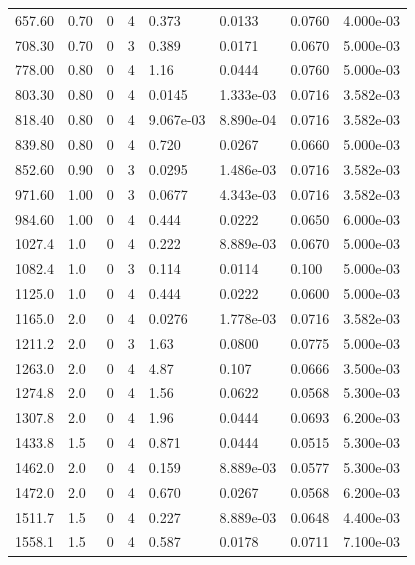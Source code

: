 \documentclass[preview]{standalone}
\begin{document}
{{\begin{tabular}{L{1.2cm}C{1.2cm} C{0.3cm}C{0.5cm} C{1.4cm}C{1.4cm} C{1.4cm}C{1.4cm}}
  657.60  &  0.70  & 0     &  4 &  0.373  & 0.0133  & 0.0760 &  4.000e-03   \\ 
  708.30  &  0.70  & 0     &  3 &  0.389  & 0.0171  & 0.0670 &  5.000e-03   \\ 
  778.00  &  0.80  & 0     &  4 &  1.16  & 0.0444  & 0.0760 &  5.000e-03   \\ 
  803.30  &  0.80  & 0     &  4 &  0.0145  & 1.333e-03  & 0.0716 &  3.582e-03   \\ 
  818.40  &  0.80  & 0     &  4 &  9.067e-03  & 8.890e-04  & 0.0716 &  3.582e-03   \\ 
  839.80  &  0.80  & 0     &  4 &  0.720  & 0.0267  & 0.0660 &  5.000e-03   \\ 
  852.60  &  0.90  & 0     &  3 &  0.0295  & 1.486e-03  & 0.0716 &  3.582e-03   \\ 
  971.60  &  1.00  & 0     &  3 &  0.0677  & 4.343e-03  & 0.0716 &  3.582e-03   \\ 
  984.60  &  1.00  & 0     &  4 &  0.444  & 0.0222  & 0.0650 &  6.000e-03   \\ 
  1027.4  &   1.0  & 0     &  4 &  0.222  & 8.889e-03  & 0.0670 &  5.000e-03   \\ 
  1082.4  &   1.0  & 0     &  3 &  0.114  & 0.0114  & 0.100 &  5.000e-03   \\ 
  1125.0  &   1.0  & 0     &  4 &  0.444  & 0.0222  & 0.0600 &  5.000e-03   \\ 
  1165.0  &   2.0  & 0     &  4 &  0.0276  & 1.778e-03  & 0.0716 &  3.582e-03   \\ 
  1211.2  &   2.0  & 0     &  3 &  1.63  & 0.0800  & 0.0775 &  5.000e-03   \\ 
  1263.0  &   2.0  & 0     &  4 &  4.87  & 0.107  & 0.0666 &  3.500e-03   \\ 
  1274.8  &   2.0  & 0     &  4 &  1.56  & 0.0622  & 0.0568 &  5.300e-03   \\ 
  1307.8  &   2.0  & 0     &  4 &  1.96  & 0.0444  & 0.0693 &  6.200e-03   \\ 
  1433.8  &   1.5  & 0     &  4 &  0.871  & 0.0444  & 0.0515 &  5.300e-03   \\ 
  1462.0  &   2.0  & 0     &  4 &  0.159  & 8.889e-03  & 0.0577 &  5.300e-03   \\ 
  1472.0  &   2.0  & 0     &  4 &  0.670  & 0.0267  & 0.0568 &  6.200e-03   \\ 
  1511.7  &   1.5  & 0     &  4 &  0.227  & 8.889e-03  & 0.0648 &  4.400e-03   \\ 
  1558.1  &   1.5  & 0     &  4 &  0.587  & 0.0178  & 0.0711 &  7.100e-03   \\ 

\end{tabular}}}
\end{document}
